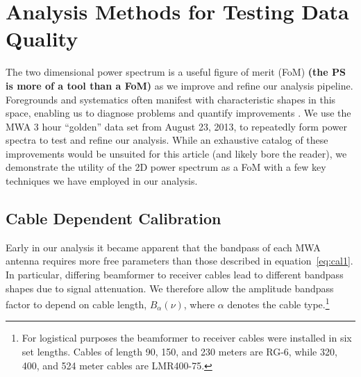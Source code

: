\documentclass[iop]{emulateapj}
\begin{document}
\section{Analysis Methods for Testing Data Quality}\label{sec:techniques}

The two dimensional power spectrum is a useful figure of merit (FoM) \textbf{(the PS is more of a tool than a FoM)} as we improve and 
refine our analysis pipeline. Foregrounds and systematics often manifest with characteristic 
shapes in this space, enabling us to diagnose problems and quantify improvements 
\citep{Morales:2012}. We use the MWA 3 hour ``golden'' data set from August 23, 2013, to 
repeatedly form power spectra to test and refine our analysis. While an exhaustive catalog 
of these improvements would be unsuited for this article (and likely bore the reader), we 
demonstrate the utility of the 2D power spectrum as a FoM with a few key techniques we 
have employed in our analysis. 

\subsection{Cable Dependent Calibration}\label{sec:cables}

Early in our analysis it became apparent that the bandpass of each MWA antenna requires 
more free parameters than those described in equation~\ref{eq:cal1}. In particular, differing 
beamformer to receiver cables lead to different bandpass shapes due to signal attenuation. 
We therefore allow the amplitude bandpass factor to depend on cable length, $B_{\alpha}
(\nu)$, where $\alpha$ denotes the cable type.\footnote{For logistical purposes the 
beamformer to receiver cables were installed in six set lengths. Cables of length 90, 150, 
and 230 meters are RG-6, while 320, 400, and 524 meter cables are LMR400-75.}
\end{document}
